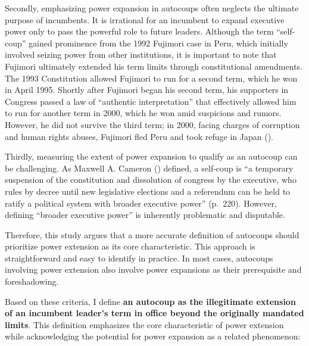\documentclass[
  12pt,
]{report}
\begin{document}
Secondly, emphasizing power expansion in autocoups often neglects the
ultimate purpose of incumbents. It is irrational for an incumbent to
expand executive power only to pass the powerful role to future leaders.
Although the term ``self-coup'' gained prominence from the 1992 Fujimori
case in Peru, which initially involved seizing power from other
institutions, it is important to note that Fujimori ultimately extended
his term limits through constitutional amendments. The 1993 Constitution
allowed Fujimori to run for a second term, which he won in April 1995.
Shortly after Fujimori began his second term, his supporters in Congress
passed a law of ``authentic interpretation'' that effectively allowed
him to run for another term in 2000, which he won amid suspicions and
rumors. However, he did not survive the third term; in 2000, facing
charges of corruption and human rights abuses, Fujimori fled Peru and
took refuge in Japan ().

Thirdly, measuring the extent of power expansion to qualify as an
autocoup can be challenging. As Maxwell A. Cameron
() defined, a self-coup is ``a
temporary suspension of the constitution and dissolution of congress by
the executive, who rules by decree until new legislative elections and a
referendum can be held to ratify a political system with broader
executive power'' (p.~220). However, defining ``broader executive
power'' is inherently problematic and disputable.

Therefore, this study argues that a more accurate definition of
autocoups should prioritize power extension as its core characteristic.
This approach is straightforward and easy to identify in practice. In
most cases, autocoups involving power extension also involve power
expansions as their prerequisite and foreshadowing.

Based on these criteria, I define \textbf{an autocoup as the
illegitimate extension of an incumbent leader's term in office beyond
the originally mandated limits}. This definition emphasizes the core
characteristic of power extension while acknowledging the potential for
power expansion as a related phenomenon:
\end{document}
